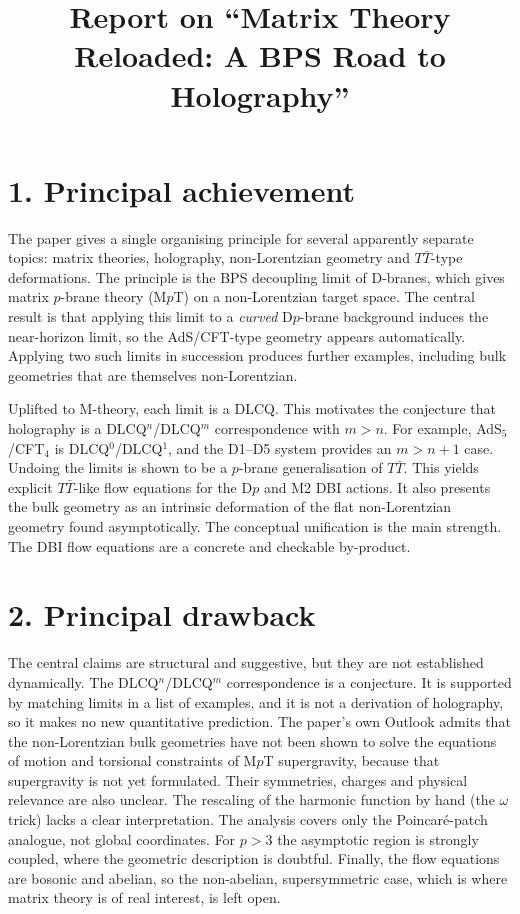 \documentclass[11pt]{article}
\title{Report on ``Matrix Theory Reloaded: A BPS Road to Holography''}
\date{}
\begin{document}
\maketitle

\section*{1. Principal achievement}
The paper gives a single organising principle for several apparently separate topics: matrix theories, holography, non-Lorentzian geometry and $T\bar T$-type deformations. The principle is the BPS decoupling limit of D-branes, which gives matrix $p$-brane theory (M$p$T) on a non-Lorentzian target space. The central result is that applying this limit to a \emph{curved} D$p$-brane background induces the near-horizon limit, so the AdS/CFT-type geometry appears automatically. Applying two such limits in succession produces further examples, including bulk geometries that are themselves non-Lorentzian.

Uplifted to M-theory, each limit is a DLCQ. This motivates the conjecture that holography is a DLCQ$^n$/DLCQ$^m$ correspondence with $m>n$. For example, AdS$_5$/CFT$_4$ is DLCQ$^0$/DLCQ$^1$, and the D1--D5 system provides an $m>n+1$ case. Undoing the limits is shown to be a $p$-brane generalisation of $T\bar T$. This yields explicit $T\bar T$-like flow equations for the D$p$ and M2 DBI actions. It also presents the bulk geometry as an intrinsic deformation of the flat non-Lorentzian geometry found asymptotically. The conceptual unification is the main strength. The DBI flow equations are a concrete and checkable by-product.

\section*{2. Principal drawback}
The central claims are structural and suggestive, but they are not established dynamically. The DLCQ$^n$/DLCQ$^m$ correspondence is a conjecture. It is supported by matching limits in a list of examples, and it is not a derivation of holography, so it makes no new quantitative prediction. The paper's own Outlook admits that the non-Lorentzian bulk geometries have not been shown to solve the equations of motion and torsional constraints of M$p$T supergravity, because that supergravity is not yet formulated. Their symmetries, charges and physical relevance are also unclear. The rescaling of the harmonic function by hand (the $\omega$ trick) lacks a clear interpretation. The analysis covers only the Poincar\'e-patch analogue, not global coordinates. For $p>3$ the asymptotic region is strongly coupled, where the geometric description is doubtful. Finally, the flow equations are bosonic and abelian, so the non-abelian, supersymmetric case, which is where matrix theory is of real interest, is left open.
\end{document}
